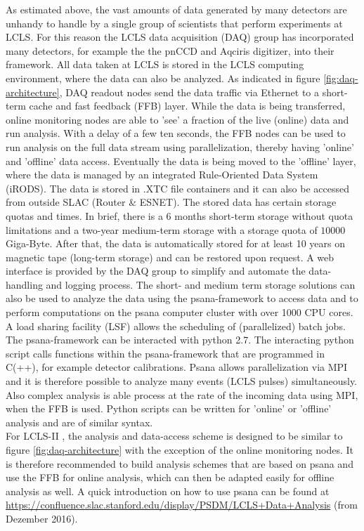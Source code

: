 As estimated above, the vast amounts of data generated by many detectors are unhandy to handle by a single group of scientists that perform experiments at LCLS. For this reason the LCLS data acquisition (DAQ) group has incorporated many detectors, for example the the pnCCD and Aqciris digitizer, into their framework. All data taken at LCLS is stored in the LCLS computing environment, where the data can also be analyzed. As indicated in figure \ref{fig:daq-architecture}, DAQ readout nodes send the data traffic via Ethernet to a short-term cache and fast feedback (FFB) layer. While the data is being transferred, online monitoring nodes are able to 'see' a fraction of the live (online) data and run analysis. With a delay of a few ten seconds, the FFB nodes can be used to run analysis on the full data stream using parallelization, thereby having 'online' and 'offline' data access. Eventually the data is being moved to the 'offline' layer, where the data is managed by an integrated Rule-Oriented Data System (iRODS). The data is stored in .XTC file containers and it can also be accessed from outside SLAC (Router \& ESNET). The stored data has certain storage quotas and times. In brief, there is a 6 months short-term storage without quota limitations and a two-year medium-term storage with a storage quota of $10 000$ Giga-Byte. After that, the data is automatically stored for at least 10 years on magnetic tape (long-term storage) and can be restored upon request. A web interface is provided by the DAQ group to simplify and automate the data-handling and logging process. The short- and medium term storage solutions can also be used to analyze the data using the psana-framework to access data and to perform computations on the psana computer cluster with over 1000 CPU cores. A load sharing facility (LSF) allows the scheduling of (parallelized) batch jobs. The psana-framework can be interacted with python 2.7. The interacting python script calls functions within the psana-framework that are programmed in C(++), for example detector calibrations. Psana allows parallelization via MPI and it is therefore possible to analyze many events (LCLS pulses) simultaneously. Also complex analysis is able process at the rate of the incoming data using MPI, when the FFB is used. Python scripts can be written for 'online' or 'offline' analysis and are of similar syntax.\\
For LCLS-II \citep{Amadeo-2016-SLAC}, the analysis and data-access scheme is designed to be similar to figure \ref{fig:daq-architecture} with the exception of the online monitoring nodes. It is therefore recommended to build analysis schemes that are based on psana and use the FFB for online analysis, which can then be adapted easily for offline analysis as well. A quick introduction on how to use psana can be found at \url{https://confluence.slac.stanford.edu/display/PSDM/LCLS+Data+Analysis} (from Dezember 2016).
%
%
%
